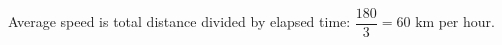 Average speed is total distance divided by elapsed time: $\dfrac{180}{3}=\boxed{60\text{ km per hour}}$.
